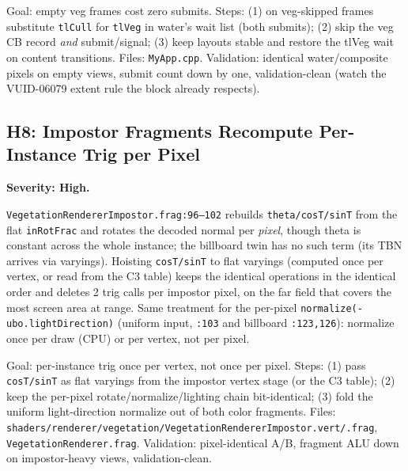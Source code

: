 \documentclass[11pt,a4paper]{article}
\begin{document}
\begin{tcolorbox}[promptbox={Prompt --- H7: reroute water's wait, elide the veg submit}]
Goal: empty veg frames cost zero submits. Steps: (1) on veg-skipped frames
substitute \texttt{tlCull} for \texttt{tlVeg} in water's wait list (both
submits); (2) skip the veg CB record \emph{and} submit/signal; (3) keep
layouts stable and restore the tlVeg wait on content transitions. Files:
\texttt{MyApp.cpp}. Validation: identical water/composite pixels on empty
views, submit count down by one, validation-clean (watch the VUID-06079
extent rule the block already respects).
\end{tcolorbox}

\subsection{H8: Impostor Fragments Recompute Per-Instance Trig per Pixel}

\textbf{Severity: High.}

\texttt{VegetationRendererImpostor.frag:96--102} rebuilds
\texttt{theta/cosT/sinT} from the flat \texttt{inRotFrac} and rotates the
decoded normal per \emph{pixel}, though theta is constant across the whole
instance; the billboard twin has no such term (its TBN arrives via
varyings). Hoisting \texttt{cosT/sinT} to flat varyings (computed once per
vertex, or read from the C3 table) keeps the identical operations in the
identical order and deletes 2 trig calls per impostor pixel, on the far
field that covers the most screen area at range. Same treatment for the
per-pixel \texttt{normalize(-ubo.lightDirection)} (uniform input,
\texttt{:103} and billboard \texttt{:123,126}): normalize once per draw
(CPU) or per vertex, not per pixel.

\begin{tcolorbox}[promptbox={Prompt --- H8: flat trig varyings for impostors}]
Goal: per-instance trig once per vertex, not once per pixel. Steps:
(1) pass \texttt{cosT/sinT} as flat varyings from the impostor vertex stage
(or the C3 table); (2) keep the per-pixel rotate/normalize/lighting chain
bit-identical; (3) fold the uniform light-direction normalize out of both
color fragments. Files:
\texttt{shaders/renderer/vegetation/VegetationRendererImpostor.vert/.frag},
\texttt{VegetationRenderer.frag}. Validation: pixel-identical A/B,
fragment ALU down on impostor-heavy views, validation-clean.
\end{tcolorbox}

\end{document}
